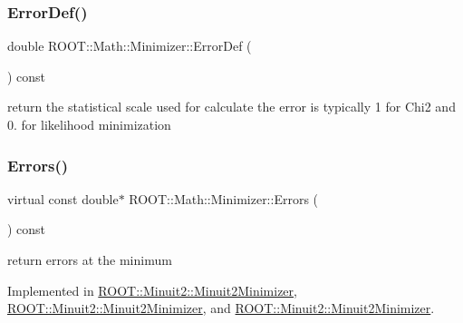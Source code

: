 \subsubsection{\texorpdfstring{ErrorDef()}{ErrorDef()}\hspace{0.1cm}{\footnotesize\ttfamily [3/3]}}
{\footnotesize\ttfamily double R\+O\+O\+T\+::\+Math\+::\+Minimizer\+::\+Error\+Def (\begin{DoxyParamCaption}{ }\end{DoxyParamCaption}) const\hspace{0.3cm}{\ttfamily [inline]}}

return the statistical scale used for calculate the error is typically 1 for Chi2 and 0. for likelihood minimization \mbox{\label{classROOT_1_1Math_1_1Minimizer_a42f71e22f16cf4c59b621cf7e1e75f3d}} 
\subsubsection{\texorpdfstring{Errors()}{Errors()}\hspace{0.1cm}{\footnotesize\ttfamily [1/3]}}
{\footnotesize\ttfamily virtual const double$\ast$ R\+O\+O\+T\+::\+Math\+::\+Minimizer\+::\+Errors (\begin{DoxyParamCaption}{ }\end{DoxyParamCaption}) const\hspace{0.3cm}{\ttfamily [pure virtual]}}



return errors at the minimum 



Implemented in \mbox{\hyperlink{classROOT_1_1Minuit2_1_1Minuit2Minimizer_a69c6dd9654ce41856814b358570cb9d7}{R\+O\+O\+T\+::\+Minuit2\+::\+Minuit2\+Minimizer}}, \mbox{\hyperlink{classROOT_1_1Minuit2_1_1Minuit2Minimizer_a69c6dd9654ce41856814b358570cb9d7}{R\+O\+O\+T\+::\+Minuit2\+::\+Minuit2\+Minimizer}}, and \mbox{\hyperlink{classROOT_1_1Minuit2_1_1Minuit2Minimizer_a69c6dd9654ce41856814b358570cb9d7}{R\+O\+O\+T\+::\+Minuit2\+::\+Minuit2\+Minimizer}}.

\mbox{\label{classROOT_1_1Math_1_1Minimizer_a42f71e22f16cf4c59b621cf7e1e75f3d}} 
